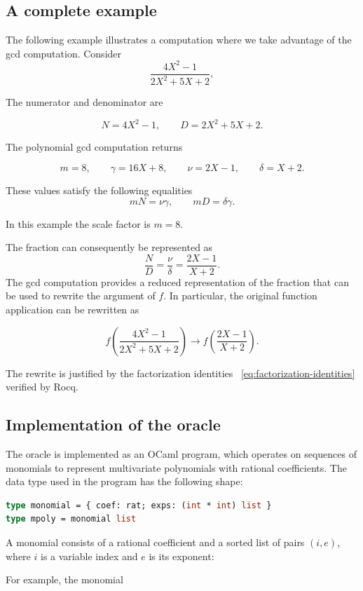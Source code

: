 \documentclass{jflart}
\begin{document}
\subsection{A complete example}

The following example illustrates a computation where we take advantage of
the gcd computation.  Consider
\[
\frac{4 X^2-1}{2X^2+5X+2},
\]

The numerator and denominator are

\[
  N=4X^2-1,\qquad D=2X^2+5X+2.
\]

The polynomial gcd computation returns

\[
  m = 8,
  \qquad
  \gamma=16X+8,
  \qquad
  \nu=2X-1,
  \qquad
  \delta=X+2.
\]

These values satisfy the following equalities
\begin{equation}
  mN=\nu\gamma,
  \qquad
  mD=\delta\gamma.
  \label{eq:factorization-identities}
\end{equation}

In this example the scale factor is $m=8$.

The fraction can consequently be represented as
\[
  \frac{N}{D}
  =
  \frac{\nu}{\delta}
  =
  \frac{2X-1}{X+2}.
\]
The gcd computation provides a reduced representation of the fraction that
can be used to rewrite the argument of \(f\). In particular, the original
function application can be rewritten as

\[
f\left(\frac{4 X^2-1}{2X^2+5X+2}\right)
\longrightarrow
f\left(\frac{2X-1}{X+2}\right).
\]

The rewrite is justified by the factorization identities ~\ref{eq:factorization-identities} verified by Rocq.

\subsection{Implementation of the oracle}
The oracle is implemented as an OCaml program, which operates on sequences of
monomials to represent multivariate polynomials with rational coefficients.
The data type used in the program has the following shape:
\begin{lstlisting}[language=ML]
type monomial = { coef: rat; exps: (int * int) list }
type mpoly = monomial list
\end{lstlisting}
A monomial
consists of a rational coefficient and a sorted list of pairs $(i,e)$, where
$i$ is a variable index and $e$ is its exponent:


For example, the monomial
\end{document}
